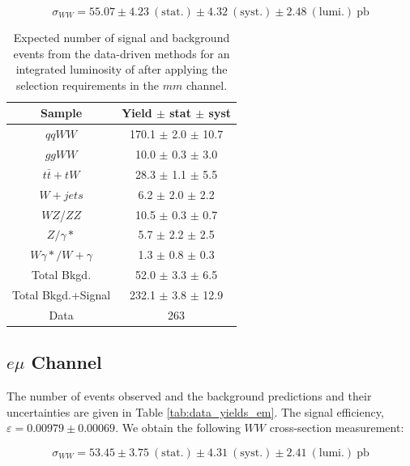 \begin{equation*}
\sigma_{WW}  = 55.07 \pm 4.23~\mathrm{(stat.)} \pm 4.32~\mathrm{(syst.)} \pm 2.48~\mathrm{(lumi.)~pb}
\end{equation*}

\begin{table}[ht!]
  \begin{center}
  \begin{tabular} {|c|c|}
\hline
Sample                & Yield $\pm$ stat $\pm$ syst \\ \hline \hline
$qqWW$                & 170.1 $\pm$  2.0 $\pm$ 10.7  \\ \hline
$ggWW$                & 10.0 $\pm$  0.3 $\pm$  3.0  \\ \hline
$t\bar{t} + tW$      & 28.3 $\pm$  1.1 $\pm$  5.5  \\ \hline
$W+jets$              &  6.2 $\pm$  2.0 $\pm$  2.2  \\ \hline
$WZ$/$ZZ$             & 10.5 $\pm$  0.3 $\pm$  0.7  \\ \hline
$Z/\gamma*$          &  5.7 $\pm$  2.2 $\pm$  2.5  \\ \hline
$W\gamma*/W+\gamma$ &  1.3 $\pm$  0.8 $\pm$  0.3  \\ \hline \hline
Total Bkgd.           & 52.0 $\pm$  3.3 $\pm$  6.5  \\ \hline \hline
Total Bkgd.+Signal    & 232.1 $\pm$  3.8 $\pm$ 12.9  \\ \hline \hline
Data                  & 263 \\ \hline
\end{tabular}
  \caption{Expected number of signal and background events from the data-driven methods for
  an integrated luminosity of \intlumi after applying the selection requirements in the $mm$ channel.}
   \label{tab:data_yields_mm}
  \end{center}
\end{table}

%
%
%
\subsection{$e \mu$ Channel}

The number of events observed and the background predictions and their uncertainties are
given in Table \ref{tab:data_yields_em}.
The signal efficiency,  $\varepsilon = 0.00979 \pm 0.00069$.
We obtain the following $WW$ cross-section measurement:

\begin{equation*}
\sigma_{WW}  = 53.45 \pm 3.75~\mathrm{(stat.)} \pm 4.31~\mathrm{(syst.)} \pm 2.41~\mathrm{(lumi.)~pb} 
\end{equation*}

